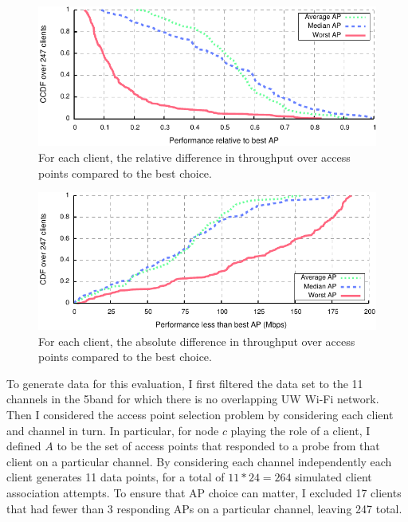 \begin{figure}[t]
	\centering
	\includegraphics[width=\textwidth]{figures/applications/ap_sel_rel_diff.pdf}
	\caption[The relative difference in throughput over 802.11n access points]{\label{fig:ap_sel_rel_diff}For each client, the relative difference in throughput over access points compared to the best choice.}
\end{figure}
\begin{figure}[!ht]
	\centering
	\includegraphics[width=\textwidth]{figures/applications/ap_sel_tpt_diff.pdf}
	\caption[The absolute difference in throughput over 802.11n access points]{\label{fig:ap_sel_tpt_diff}For each client, the absolute difference in throughput over access points compared to the best choice.}
\end{figure}

To generate data for this evaluation, I first filtered the data set to the 11 channels in the 5\GHz band for which there is no overlapping UW Wi-Fi network. Then I considered the access point selection problem by considering each client and channel in turn. In particular, for node $c$ playing the role of a client, I defined $A$ to be the set of access points that responded to a probe from that client on a particular channel. By considering each channel independently each client generates 11 data points, for a total of $11*24=264$ simulated client association attempts. To ensure that AP choice can matter, I excluded 17 clients that had fewer than 3 responding APs on a particular channel, leaving 247 total.

